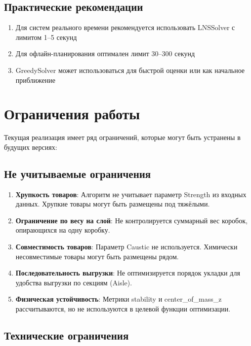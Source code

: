 \subsection{Практические рекомендации}

\begin{enumerate}
    \item Для систем реального времени рекомендуется использовать LNSSolver с лимитом 1--5 секунд
    \item Для офлайн-планирования оптимален лимит 30--300 секунд
    \item GreedySolver может использоваться для быстрой оценки или как начальное приближение
\end{enumerate}

\section{Ограничения работы}

Текущая реализация имеет ряд ограничений, которые могут быть устранены в будущих версиях:

\subsection{Не учитываемые ограничения}

\begin{enumerate}
    \item \textbf{Хрупкость товаров}: Алгоритм не учитывает параметр Strength из входных данных. Хрупкие товары могут быть размещены под тяжёлыми.
    
    \item \textbf{Ограничение по весу на слой}: Не контролируется суммарный вес коробок, опирающихся на одну коробку.
    
    \item \textbf{Совместимость товаров}: Параметр Caustic не используется. Химически несовместимые товары могут быть размещены рядом.
    
    \item \textbf{Последовательность выгрузки}: Не оптимизируется порядок укладки для удобства выгрузки по секциям (Aisle).
    
    \item \textbf{Физическая устойчивость}: Метрики stability и center\_of\_mass\_z рассчитываются, но не используются в целевой функции оптимизации.
\end{enumerate}

\subsection{Технические ограничения}

